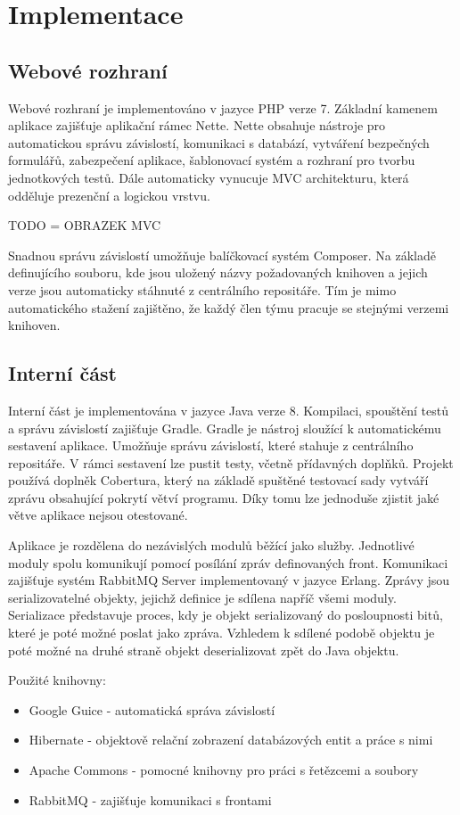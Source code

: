 \documentclass[thesis=B,czech]{FITthesis}[2012/06/26]
\begin{document}
\section{Implementace}


\subsection{Webové rozhraní}
Webové rozhraní je implementováno v jazyce PHP verze 7. Základní kamenem aplikace zajišťuje aplikační rámec Nette. Nette
obsahuje nástroje pro automatickou správu závislostí, komunikaci s databází, vytváření bezpečných formulářů, zabezpečení
aplikace, šablonovací systém a rozhraní pro tvorbu jednotkových testů. Dále automaticky vynucuje MVC architekturu, která odděluje
prezenční a logickou vrstvu.

TODO = OBRAZEK MVC
\par
Snadnou správu závislostí umožňuje balíčkovací systém Composer. 
Na základě definujícího souboru, kde jsou uložený názvy požadovaných knihoven a jejich verze jsou automaticky 
stáhnuté z centrálního repositáře. Tím je mimo automatického stažení zajištěno, že každý člen týmu pracuje se stejnými verzemi knihoven.
\subsection{Interní část}
Interní část je implementována v jazyce Java verze 8. Kompilaci, spouštění testů a správu závislostí zajišťuje Gradle.
Gradle je nástroj sloužící k automatickému sestavení aplikace. Umožňuje správu závislostí, které stahuje z centrálního repositáře. V rámci sestavení lze pustit testy, včetně přídavných doplňků. Projekt používá
doplněk Cobertura, který na základě spuštěné testovací sady vytváří zprávu obsahující pokrytí větví programu.
Díky tomu lze jednoduše zjistit jaké větve aplikace nejsou otestované.
\par
Aplikace je rozdělena do nezávislých modulů běžící jako služby. Jednotlivé moduly spolu komunikují
pomocí posílání zpráv definovaných front. Komunikaci zajišťuje systém RabbitMQ Server implementovaný v jazyce Erlang. Zprávy jsou serializovatelné objekty, jejichž definice je sdílena napříč všemi moduly.
Serializace představuje proces, kdy je objekt serializovaný do posloupnosti bitů, které je poté
možné poslat jako zpráva. Vzhledem k sdílené podobě objektu je poté možné na druhé straně
objekt deserializovat zpět do Java objektu.

\par
Použité knihovny:
\begin{itemize}
\item Google Guice - automatická správa závislostí
\item Hibernate - objektově relační zobrazení databázových entit a práce s nimi
\item Apache Commons - pomocné knihovny pro práci s řetězcemi a soubory
\item RabbitMQ - zajišťuje komunikaci s frontami
\end{itemize}
\end{document}
